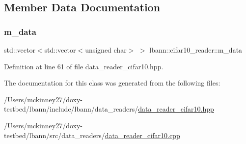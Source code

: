 \subsection{Member Data Documentation}
\mbox{\label{classlbann_1_1cifar10__reader_a9b47dab5c16987441ec5276d91a5aab5}} 
\subsubsection{\texorpdfstring{m\+\_\+data}{m\_data}}
{\footnotesize\ttfamily std\+::vector$<$std\+::vector$<$unsigned char$>$ $>$ lbann\+::cifar10\+\_\+reader\+::m\+\_\+data\hspace{0.3cm}{\ttfamily [private]}}



Definition at line 61 of file data\+\_\+reader\+\_\+cifar10.\+hpp.



The documentation for this class was generated from the following files\+:\begin{DoxyCompactItemize}
\item 
/\+Users/mckinney27/doxy-\/testbed/lbann/include/lbann/data\+\_\+readers/\hyperlink{data__reader__cifar10_8hpp}{data\+\_\+reader\+\_\+cifar10.\+hpp}\item 
/\+Users/mckinney27/doxy-\/testbed/lbann/src/data\+\_\+readers/\hyperlink{data__reader__cifar10_8cpp}{data\+\_\+reader\+\_\+cifar10.\+cpp}\end{DoxyCompactItemize}
